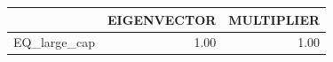\begin{tabular}{rrr}
  \hline
 & EIGENVECTOR & MULTIPLIER \\ 
  \hline
EQ\_large\_cap & 1.00 & 1.00 \\ 
   \hline
\end{tabular}
